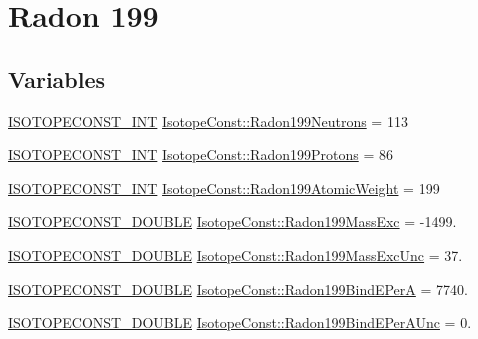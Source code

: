 \hypertarget{group___isotope_const-_radon-_rn199}{}\section{Radon 199}
\label{group___isotope_const-_radon-_rn199}
\subsection*{Variables}
\begin{DoxyCompactItemize}
\item 
\mbox{\hyperlink{group___isotope_const-_macros_ga5f18360b3e99483a35c32d789e62621c}{I\+S\+O\+T\+O\+P\+E\+C\+O\+N\+S\+T\+\_\+\+I\+NT}} \mbox{\hyperlink{group___isotope_const-_radon-_rn199_ga6de64940364ddfc6cc9cee339522d0c3}{Isotope\+Const\+::\+Radon199\+Neutrons}} = 113
\item 
\mbox{\hyperlink{group___isotope_const-_macros_ga5f18360b3e99483a35c32d789e62621c}{I\+S\+O\+T\+O\+P\+E\+C\+O\+N\+S\+T\+\_\+\+I\+NT}} \mbox{\hyperlink{group___isotope_const-_radon-_rn199_ga97777f365e671c927fe67671e82302c0}{Isotope\+Const\+::\+Radon199\+Protons}} = 86
\item 
\mbox{\hyperlink{group___isotope_const-_macros_ga5f18360b3e99483a35c32d789e62621c}{I\+S\+O\+T\+O\+P\+E\+C\+O\+N\+S\+T\+\_\+\+I\+NT}} \mbox{\hyperlink{group___isotope_const-_radon-_rn199_ga90b0228356dc095f0158edbf4f133246}{Isotope\+Const\+::\+Radon199\+Atomic\+Weight}} = 199
\item 
\mbox{\hyperlink{group___isotope_const-_macros_ga8f45a7272ce02c0b4c65c44636ed719a}{I\+S\+O\+T\+O\+P\+E\+C\+O\+N\+S\+T\+\_\+\+D\+O\+U\+B\+LE}} \mbox{\hyperlink{group___isotope_const-_radon-_rn199_ga76c75456339d813adc8aabc0716f789c}{Isotope\+Const\+::\+Radon199\+Mass\+Exc}} = -\/1499.
\item 
\mbox{\hyperlink{group___isotope_const-_macros_ga8f45a7272ce02c0b4c65c44636ed719a}{I\+S\+O\+T\+O\+P\+E\+C\+O\+N\+S\+T\+\_\+\+D\+O\+U\+B\+LE}} \mbox{\hyperlink{group___isotope_const-_radon-_rn199_ga9b550c8347179c49e9dd39a6c59b2796}{Isotope\+Const\+::\+Radon199\+Mass\+Exc\+Unc}} = 37.
\item 
\mbox{\hyperlink{group___isotope_const-_macros_ga8f45a7272ce02c0b4c65c44636ed719a}{I\+S\+O\+T\+O\+P\+E\+C\+O\+N\+S\+T\+\_\+\+D\+O\+U\+B\+LE}} \mbox{\hyperlink{group___isotope_const-_radon-_rn199_gae1710db47758b831a99d92144fb6d51d}{Isotope\+Const\+::\+Radon199\+Bind\+E\+PerA}} = 7740.
\item 
\mbox{\hyperlink{group___isotope_const-_macros_ga8f45a7272ce02c0b4c65c44636ed719a}{I\+S\+O\+T\+O\+P\+E\+C\+O\+N\+S\+T\+\_\+\+D\+O\+U\+B\+LE}} \mbox{\hyperlink{group___isotope_const-_radon-_rn199_ga7e0f948b0b04b9ac325b3936807897ae}{Isotope\+Const\+::\+Radon199\+Bind\+E\+Per\+A\+Unc}} = 0.

\end{DoxyCompactItemize}
